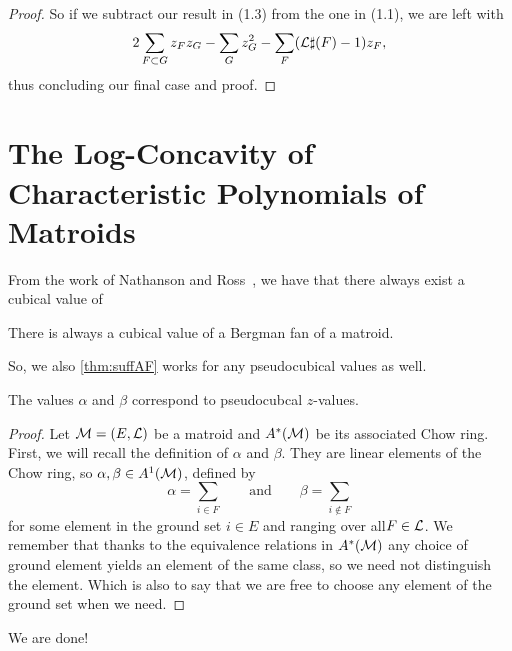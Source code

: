 \documentclass[12pt,oneside]{../../sfsuthesis}
\begin{document}
\begin{proof}
    So if we subtract our result in (1.3) from the one in (1.1), we are left with
    \[
        2\sum_{F \subset G} z_F z_G - \sum_G z^2_G - \sum_F (\mathcal{L}\sharp(F) - 1)z_F,
    \]
    thus concluding our final case and proof.

\end{proof}

\section{The Log-Concavity of Characteristic Polynomials of Matroids}

\begin{Result}
\end{Result}

From the work of Nathanson and Ross~\cite{nathansonTropicalFansNormal2021}, we have that there always exist a cubical value of
\begin{lemma}
    There is always a cubical value of a Bergman fan of a matroid.
\end{lemma}
So, we also \th\ref{thm:suffAF} works for any pseudocubical values as well.

\begin{lemma}
    The values \( \alpha \) and \( \beta \) correspond to pseudocubcal \( z \)-values.
\end{lemma}
\begin{proof}
    Let \( \mathcal{M} = (E, \mathcal{L}) \) be a matroid and \( A^*(\mathcal{M}) \) be its associated Chow ring.
    First, we will recall the definition of \( \alpha \) and \( \beta \).
    They are linear elements of the Chow ring, so \( \alpha, \beta \in A^1(\mathcal{M}) \), defined by
    \[
        \alpha = \sum_{i \in F} \quad \quad \text{and} \quad \quad \beta = \sum_{i \notin F}
    \]
    for some element in the ground set \( i \in E \) and ranging over all\( F \in \mathcal{L} \).
    We remember that thanks to the equivalence relations in \( A^\ast(\mathcal{M}) \) any choice of ground element yields an element of the same class, so we need not distinguish the element.
    Which is also to say that we are free to choose any element of the ground set when we need.

\end{proof}

We are done!
\end{document}
